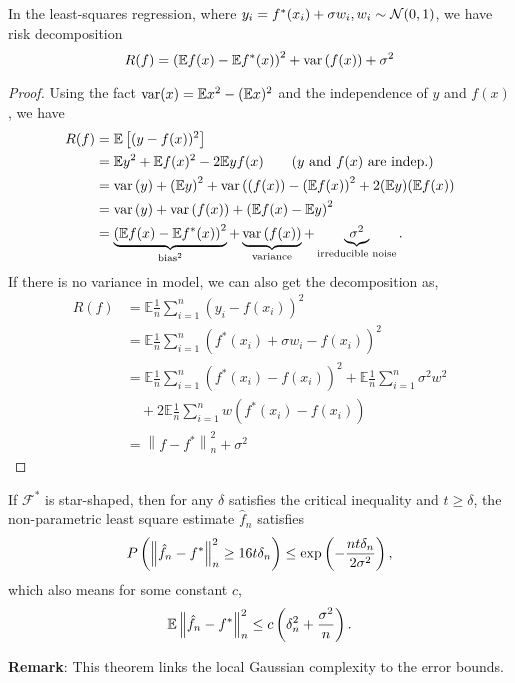 \begin{theorem} In the least-squares regression, where $y_i = f^*(x_i) + \sigma w_i, w_i \sim \mathcal{N}(0,1)$, we have risk decomposition
$$
R(f)=\left(\mathbb{E} f(x) - \mathbb{E} f^*(x)\right)^2 + \mathrm{var}\left(f(x)\right) + \sigma^{2}
$$
\end{theorem}
\begin{proof} Using the fact $ \mathrm{var}(x) =  \mathbb{E} x^2 - (\mathbb{E} x)^2 $ and the independence of $y$ and $f(x)$, we have
\begin{align*}
    R(f) & = \mathbb{E}\left[(y - f(x))^2\right] \\
         & = \mathbb{E} y^2 + \mathbb{E} f(x)^2 - 2 \mathbb{E} y f(x) \qquad (y \text{ and } f(x) \text{ are indep.})\\
         & = \mathrm{var}\left(y\right) + \left(\mathbb{E} y\right)^2 + \mathrm{var}\left((f(x)\right) - \left(\mathbb{E} f(x)\right)^2 + 2 (\mathbb{E} y) (\mathbb{E} f(x)) \\
         & = \mathrm{var}\left(y\right) + \mathrm{var}\left(f(x)\right)  + \left(\mathbb{E} f(x) - \mathbb{E} y\right)^2 \\
         & =\underbrace{\left(\mathbb{E} f(x) - \mathbb{E} f^*(x)\right)^2}_{\text{bias}^2} + \underbrace{\mathrm{var}\left(f(x)\right)}_{\text{variance}} + \underbrace{\sigma^2}_{\text{irreducible noise}}.
\end{align*}
If there is no variance in model, we can also get the decomposition  as,
\begin{align*}
R(f) &= \mathbb{E} \frac{1}{n} \sum_{i=1}^{n}\left(y_i -f\left(x_{i}\right)\right)^{2} \\
&= \mathbb{E} \frac{1}{n} \sum_{i=1}^{n}\left(f^{*}\left(x_{i}\right)+ \sigma w_i -f\left(x_{i}\right)\right)^{2} \\
&=\mathbb{E} \frac{1}{n} \sum_{i=1}^{n}\left(f^{*}\left(x_{i}\right)-f\left(x_{i}\right)\right)^{2}+ \mathbb{E} \frac{1}{n} \sum_{i=1}^{n} \sigma^2 w^{2} \\ 
& \quad +2 \mathbb{E} \frac{1}{n} \sum_{i=1}^{n}  w\left(f^{*}\left(x_{i}\right)-f\left(x_{i}\right)\right) \\
& = \left\|f-f^{*}\right\|_{n}^{2}+\sigma^{2}
\end{align*}
\end{proof}
\begin{theorem}
If $\mathcal{F}^*$ is star-shaped, then for any $\delta$ satisfies the critical inequality and $t \geq \delta$, the non-parametric least square estimate $\hat{f}_n$ satisfies
$$P\left(\left\lVert \hat{f}_n -f^{*} \right\rVert_{n}^{2} \geq 16 t \delta_{n}\right) \leq \exp \left(-\frac{n t \delta_{n}}{2 \sigma^{2}}\right),$$
which also means for some constant $c$,
$$
\mathbb{E} \left\lVert \hat{f}_n -f^{*} \right\rVert_{n}^{2} \leq c \left( \delta_n^2 + \frac{\sigma^2}{n} \right).
$$
\end{theorem}
\textbf{Remark}: This theorem links the local Gaussian complexity to the error bounds.

